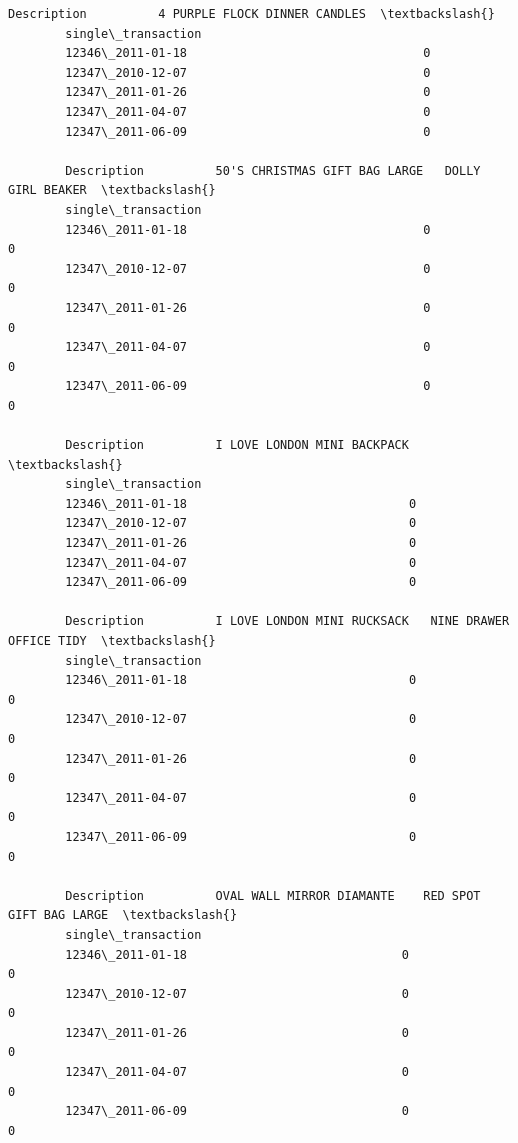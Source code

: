 \documentclass[11pt]{article}
\makeatletter
\newcommand{\boxspacing}{\kern\kvtcb@left@rule\kern\kvtcb@boxsep}
\newcommand{\prompt}[4]{
        {\ttfamily\llap{{\color{#2}[#3]:\hspace{3pt}#4}}\vspace{-\baselineskip}}
    }
\makeatother
\begin{document}
\begin{tcolorbox}[breakable, size=fbox, boxrule=.5pt, pad at break*=1mm, opacityfill=0]
    \prompt{Out}{outcolor}{7}{\boxspacing}
    \begin{Verbatim}[commandchars=\\\{\}]
        Description          4 PURPLE FLOCK DINNER CANDLES  \textbackslash{}
        single\_transaction
        12346\_2011-01-18                                 0
        12347\_2010-12-07                                 0
        12347\_2011-01-26                                 0
        12347\_2011-04-07                                 0
        12347\_2011-06-09                                 0

        Description          50'S CHRISTMAS GIFT BAG LARGE   DOLLY GIRL BEAKER  \textbackslash{}
        single\_transaction
        12346\_2011-01-18                                 0                   0
        12347\_2010-12-07                                 0                   0
        12347\_2011-01-26                                 0                   0
        12347\_2011-04-07                                 0                   0
        12347\_2011-06-09                                 0                   0

        Description          I LOVE LONDON MINI BACKPACK  \textbackslash{}
        single\_transaction
        12346\_2011-01-18                               0
        12347\_2010-12-07                               0
        12347\_2011-01-26                               0
        12347\_2011-04-07                               0
        12347\_2011-06-09                               0

        Description          I LOVE LONDON MINI RUCKSACK   NINE DRAWER OFFICE TIDY  \textbackslash{}
        single\_transaction
        12346\_2011-01-18                               0                         0
        12347\_2010-12-07                               0                         0
        12347\_2011-01-26                               0                         0
        12347\_2011-04-07                               0                         0
        12347\_2011-06-09                               0                         0

        Description          OVAL WALL MIRROR DIAMANTE    RED SPOT GIFT BAG LARGE  \textbackslash{}
        single\_transaction
        12346\_2011-01-18                              0                         0
        12347\_2010-12-07                              0                         0
        12347\_2011-01-26                              0                         0
        12347\_2011-04-07                              0                         0
        12347\_2011-06-09                              0                         0


\end{Verbatim}
\end{tcolorbox}
\end{document}
